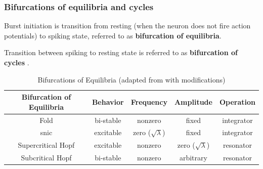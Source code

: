 \documentclass[../main.tex]{subfiles}
\begin{document}
\subsubsection{Bifurcations of equilibria and cycles}

Burst initiation is transition
from resting (when the neuron does not fire action potentials) to spiking state,
referred to as \textbf{bifurcation of equilibria}.

Transition between spiking to
resting state is referred to as \textbf{bifurcation of cycles}
\cite{izhikevichNEURALEXCITABILITYSPIKING2000,izhikevichDynamicalSystemsNeuroscience2006}.

\begin{table}[h!]
    \centering
    \begin{tabular}{|c||c|c|c|c|}
        \hline
        Bifurcation of Equilibria & Behavior & Frequency & Amplitude & Operation \\ 
        \hline
        \hline
        Fold & bi-stable & nonzero & fixed & integrator \\
        \gls{snic} & excitable & zero ($\sqrt{\lambda}$) & fixed & integrator \\
        Supercritical Hopf & excitable & nonzero & zero ($\sqrt{\lambda}$) & resonator \\
        Subcritical Hopf & bi-stable & nonzero & arbitrary & resonator \\
        \hline
    \end{tabular}
    \caption[Bifurcations of Equilibria]{Bifurcations of Equilibria
    (adapted from \cite{izhikevichNEURALEXCITABILITYSPIKING2000} with modifications)}
    \label{tab:bifurcations_equilibria}
\end{table}
\end{document}
